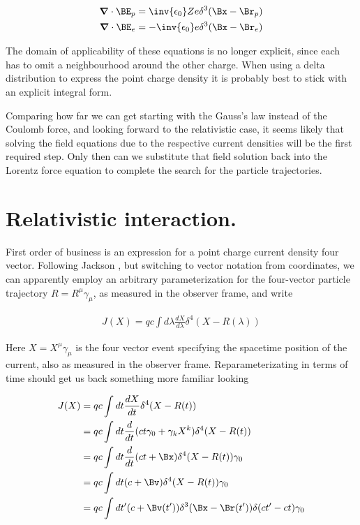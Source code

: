 \begin{align}\label{eqn:nuclearInteraction:boo6}
\spacegrad \cdot \BE_p &= \inv{\epsilon_0} Z e \delta^3(\Bx - \Br_p) \\
\spacegrad \cdot \BE_e &= -\inv{\epsilon_0} e \delta^3(\Bx - \Br_e) 
\end{align}

The domain of applicability of these equations is no longer explicit, since each has to omit a neighbourhood around the other charge.  When using a delta distribution to express the point charge density it is probably best to stick with an explicit integral form.

Comparing how far we can get starting with the Gauss's law instead of the Coulomb force, and looking forward to the relativistic case, it seems likely that solving the field equations due to the respective current densities will be the first required step.  Only then can we substitute that field solution back into the Lorentz force equation to complete the search for the particle trajectories.

\section{Relativistic interaction.}

First order of business is an expression for a point charge current density four vector.  Following Jackson \cite{jackson1975cew}, but switching to vector notation from coordinates, we can apparently employ an arbitrary parameterization for the four-vector particle trajectory $R = R^\mu \gamma_\mu$, as measured in the observer frame, and write

\begin{align}\label{eqn:nuclearInteraction:boo7}
J(X) = q c \int d\lambda \frac{dX}{d\lambda} \delta^4 (X - R(\lambda))
\end{align}

Here $X = X^\mu \gamma_\mu$ is the four vector event specifying the spacetime position of the current, also as measured in the observer frame.  Reparameterizating in terms of time should get us back something more familiar looking

\begin{align*}
J(X) 
&= q c \int dt \frac{dX}{dt} \delta^4 (X - R(t)) \\
&= q c \int dt \frac{d}{dt} (c t \gamma_0 + \gamma_k X^k)\delta^4 (X - R(t)) \\
&= q c \int dt \frac{d}{dt} (c t + \Bx)\delta^4 (X - R(t)) \gamma_0 \\
&= q c \int dt (c + \Bv)\delta^4 (X - R(t)) \gamma_0 \\
&= q c \int dt' (c + \Bv(t'))\delta^3 (\Bx - \Br(t')) \delta(c t' - c t) \gamma_0 \\
\end{align*}

